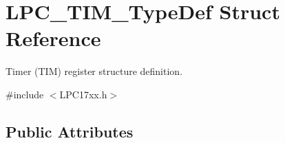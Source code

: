 \hypertarget{struct_l_p_c___t_i_m___type_def}{\section{\-L\-P\-C\-\_\-\-T\-I\-M\-\_\-\-Type\-Def \-Struct \-Reference}
\label{struct_l_p_c___t_i_m___type_def}
}


\-Timer (\-T\-I\-M) register structure definition.  




{\ttfamily \#include $<$\-L\-P\-C17xx.\-h$>$}

\subsection*{\-Public \-Attributes}

